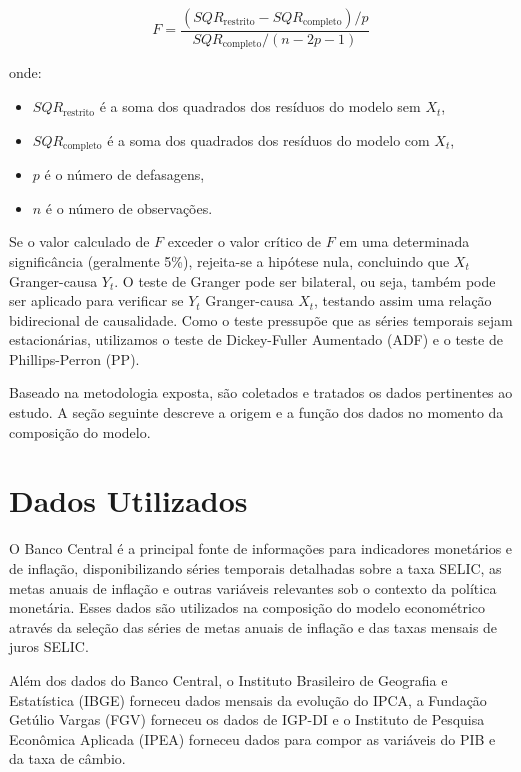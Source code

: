 \documentclass[12pt,oneside,a4paper,chapter=TITLE,english,brazil,sumario=abnt-6027-2012]{abntex2}
\begin{document}
\begin{equation}
	\label{eqn:squares}
	F = \frac{(SQR_{\text{restrito}} - SQR_{\text{completo}})/p}{SQR_{\text{completo}}/(n - 2p - 1)}
\end{equation}

onde:

\begin{itemize}
	\item \( SQR_{\text{restrito}} \) é a soma dos quadrados dos resíduos do modelo sem \( X_t \),
	\item \( SQR_{\text{completo}} \) é a soma dos quadrados dos resíduos do modelo com \( X_t \),
	\item \( p \) é o número de defasagens,
	\item \( n \) é o número de observações.
\end{itemize}

Se o valor calculado de \( F \) exceder o valor crítico de \( F \) em uma determinada significância (geralmente 5\%), rejeita-se a hipótese nula, concluindo que \( X_t \) Granger-causa \( Y_t \). O teste de Granger pode ser bilateral, ou seja, também pode ser aplicado para verificar se \( Y_t \) Granger-causa \( X_t \), testando assim uma relação bidirecional de causalidade. Como o teste pressupõe que as séries temporais sejam estacionárias, utilizamos o teste de Dickey-Fuller Aumentado (ADF) e o teste de Phillips-Perron (PP).

Baseado na metodologia exposta, são coletados e tratados os dados pertinentes ao estudo. A seção seguinte descreve a origem e a função dos dados no momento da composição do modelo.

\section{Dados Utilizados}

O Banco Central é a principal fonte de informações para indicadores monetários e de inflação, disponibilizando séries temporais detalhadas sobre a taxa SELIC, as metas anuais de inflação e outras variáveis relevantes sob o contexto da política monetária. Esses dados são utilizados na composição do modelo econométrico através da seleção das séries de metas anuais de inflação e das taxas mensais de juros SELIC. 

Além dos dados do Banco Central, o Instituto Brasileiro de Geografia e Estatística (IBGE) forneceu dados mensais da evolução do IPCA, a Fundação Getúlio Vargas (FGV) forneceu os dados de IGP-DI e o Instituto de Pesquisa Econômica Aplicada (IPEA) forneceu dados para compor as variáveis do PIB e da taxa de câmbio. 
\end{document}
